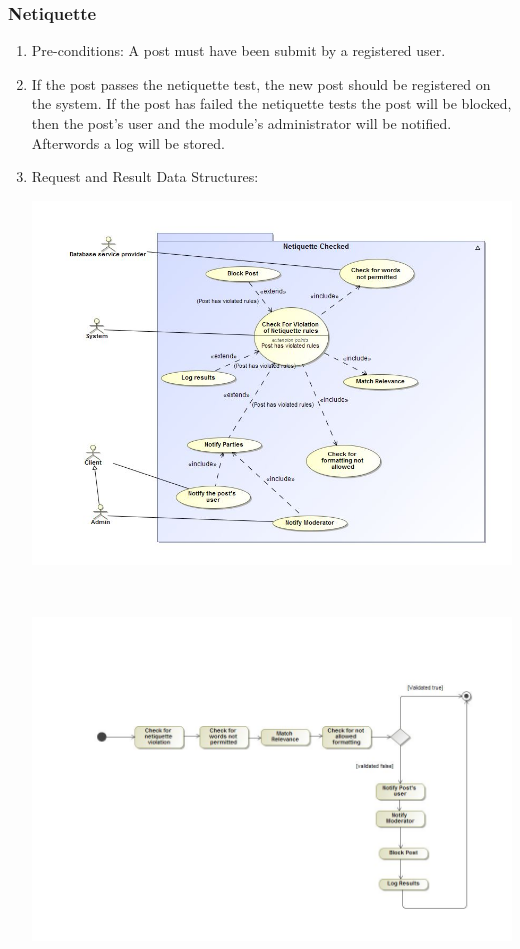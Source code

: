 \documentclass[hidelinks, 12pt, oneside]{article}
\begin{document}
\subsubsection{Netiquette}
\begin{enumerate}
 \item Pre-conditions: A post must have been submit by a registered user.

 
 \item If the post passes the netiquette test, the new post should be registered on the system. If the post has failed the netiquette tests the post will be blocked, then the post's user and the module's administrator will be notified. Afterwords a log will be stored.  

 \item Request and Result Data Structures:\\
  \centerline{\includegraphics[scale=0.4]{netiquetteUseCase}}\\
 \centerline{\includegraphics[scale=0.35]{NetiquetteActivityDiagram}} 
\end{enumerate}
\end{document}

